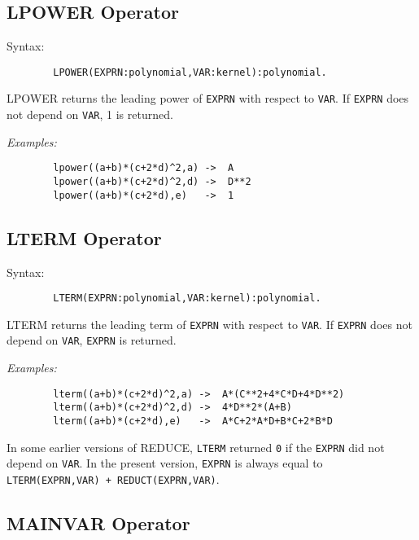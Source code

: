 \subsection{LPOWER Operator}
\hypertarget{operator:LPOWER}{}

Syntax:
\begin{verbatim}
        LPOWER(EXPRN:polynomial,VAR:kernel):polynomial.
\end{verbatim}
LPOWER returns the leading power of \texttt{EXPRN} with respect to \texttt{VAR}.
If \texttt{EXPRN} does not depend on \texttt{VAR}, 1 is returned.

\textit{Examples:}
\begin{verbatim}
        lpower((a+b)*(c+2*d)^2,a) ->  A
        lpower((a+b)*(c+2*d)^2,d) ->  D**2
        lpower((a+b)*(c+2*d),e)   ->  1
\end{verbatim}

\subsection{LTERM Operator}
\hypertarget{operator:LTERM}{}

\begin{samepage}
Syntax:
\begin{verbatim}
        LTERM(EXPRN:polynomial,VAR:kernel):polynomial.
\end{verbatim}
LTERM returns the leading term of \texttt{EXPRN} with respect to \texttt{VAR}.
If \texttt{EXPRN} does not depend on \texttt{VAR}, \texttt{EXPRN} is returned.
\end{samepage}

\textit{Examples:}
\begin{verbatim}
        lterm((a+b)*(c+2*d)^2,a) ->  A*(C**2+4*C*D+4*D**2)
        lterm((a+b)*(c+2*d)^2,d) ->  4*D**2*(A+B)
        lterm((a+b)*(c+2*d),e)   ->  A*C+2*A*D+B*C+2*B*D
\end{verbatim}

{\COMPATNOTE} In some earlier versions of REDUCE, \texttt{LTERM} returned
\texttt{0} if the \texttt{EXPRN} did not depend on \texttt{VAR}.  In the present
version, \texttt{EXPRN} is always equal to 
\texttt{LTERM(EXPRN,VAR) + REDUCT(EXPRN,VAR)}.

\subsection{MAINVAR Operator}
\hypertarget{operator:MAINVAR}{}

